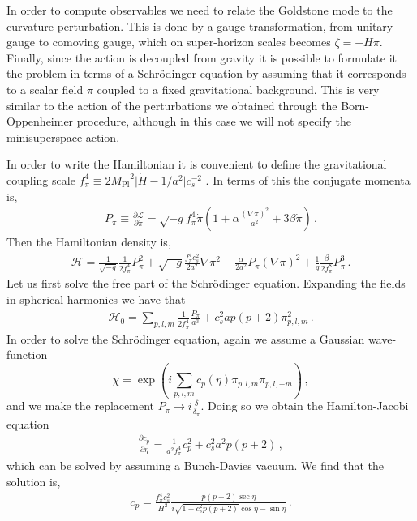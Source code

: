 \documentclass[a4paper,11pt]{article}
\numberwithin{equation}{section}
\newcommand{\mpl}{{M_{\mathrm{Pl}}}}
\numberwithin{equation}{section}
\begin{document}
In order to compute observables we need to relate the  Goldstone mode to the curvature perturbation. This is done by a  gauge transformation, from unitary gauge to comoving gauge, which on super-horizon scales becomes $\zeta=-H\pi$. Finally, since the action is decoupled from gravity it is possible to  formulate it the problem in terms of a Schr\"odinger equation by assuming that it corresponds to a scalar field $\pi$ coupled to a fixed gravitational background. This is very similar to the action of the perturbations we obtained through the Born-Oppenheimer procedure, although in this case we will not specify the minisuperspace action. 

In order to write the Hamiltonian it is convenient to define the gravitational coupling scale $f_\pi^4\equiv 2\mpl^2 \vert\dot H-1/a^2\vert c_s^{-2}$  . In terms of this the  conjugate momenta is,
\begin{align}
P_\pi\equiv \frac{\partial\mathcal L}{\partial\dot\pi}=\sqrt{-g} f_\pi^4\dot\pi \left(1+\alpha \frac{(\nabla \pi)^2}{a^2}+3\beta\dot\pi\right) \,.
\end{align} 
Then the Hamiltonian density is,
\begin{align}
\mathcal{H}=\frac{1}{\sqrt{-g}}\frac{1}{2f_\pi^4}P_\pi^2+\sqrt{-g}\frac{f_\pi^4c_s^2}{2a^2 }\nabla\pi^2-\frac{\alpha}{2a^2}P_\pi(\nabla\pi)^2+\frac{1}{g}\frac{\beta}{2f_\pi^8}P_\pi^3 \,.
\end{align}
Let us first solve the free part of the Schr\"odinger equation. Expanding the fields in spherical harmonics we have that 
\begin{align}
\mathcal{H}_0=\sum_{p, l, m}\frac{1}{2f_\pi^4}\frac{P_\pi}{a^3}+c_s^2a p(p+2)\pi_{p, l, m}^2 \,.
\end{align}
In order to solve the Schr\"odinger equation, again we assume a Gaussian wave-function
\begin{equation}
\chi=\exp(i\sum_{p, l, m} c_p(\eta)\pi_{p, l, m} \pi_{p, l, -m}) \,,
\end{equation}
and we make the replacement
$P_\pi\to i\frac{\delta}{\delta_\pi}$. Doing so we obtain the Hamilton-Jacobi equation
\begin{align}
\frac{\partial c_p}{\partial\eta}=\frac{1}{a^2f_\pi^4} c_p^2+c_s^2a^2 p (p+2) \,,
\end{align}
which can be  solved by assuming a Bunch-Davies vacuum. We find that the solution is,
\begin{align}
c_p= \frac{f_\pi^4 c_s^2}{H^2} \frac{ p(p+2)\sec\eta}{i\sqrt{1+c_s^2 p(p+2)}\cos\eta - \sin\eta} \,.
\label{eq:cl_EFT}
\end{align}
\end{document}
